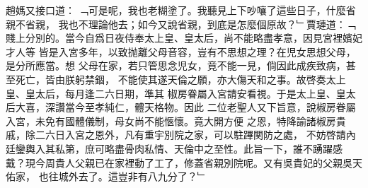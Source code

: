 趙媽又接口道：%
﹁可是呢，我也老糊塗了。我聽見上下吵嚷了這些日子，什麼省親不省親，%
我也不理論他去；如今又說省親，到底是怎麼個原故？﹂賈璉道：﹁%
%
賤上分別的。當今自爲日夜侍奉太上皇、皇太后，尚不能略盡孝意，因見宮裡嬪妃才人等%
皆是入宮多年，以致抛離父母音容，豈有不思想之理？在児女思想父母，是分所應當。想%
父母在家，若只管思念児女，竟不能一見，倘因此成疾致病，甚至死亡，皆由朕躬禁錮，%
不能使其遂天倫之願，亦大傷天和之事。故啓奏太上皇、皇太后，每月逢二六日期，準其%
椒房眷屬入宮請安看視。于是太上皇、皇太后大喜，深讚當今至孝純仁，體天格物。因此%
二位老聖人又下旨意，說椒房眷屬入宮，未免有國體儀制，母女尚不能愜懷。竟大開方便%
之恩，特降諭諸椒房貴戚，除二六日入宮之恩外，凡有重宇別院之家，可以駐蹕関防之處，%
不妨啓請內廷鑾輿入其私第，庶可略盡骨肉私情、天倫中之至性。此旨一下，誰不踴躍感%
戴？現今周貴人父親已在家裡動了工了，修蓋省親別院呢。又有吳貴妃的父親吳天佑家，%
也往城外去了。這豈非有八九分了？﹂%
